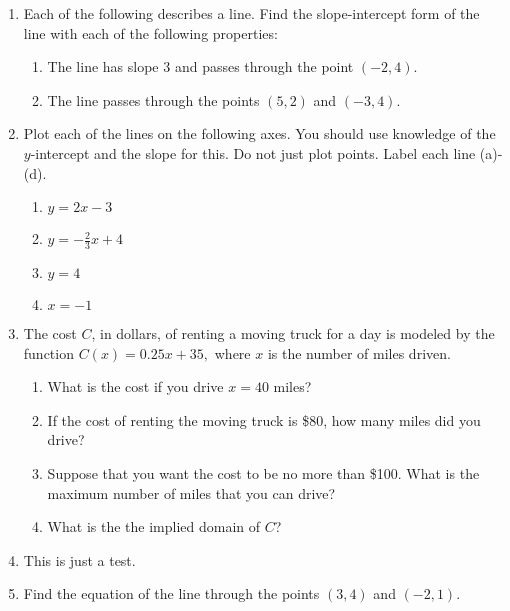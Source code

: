 \documentclass{article}
\providecommand{\tightlist}{%
  \setlength{\itemsep}{0pt}\setlength{\parskip}{0pt}}
\begin{document}
\begin{enumerate}
\item Each of the following describes a line. Find the slope-intercept form of
the line with each of the following properties:

\begin{enumerate}
\def\labelenumi{\arabic{enumi}.}
\item
  The line has slope 3 and passes through the point \((-2,4)\).
\item
  The line passes through the points \((5,2)\) and \((-3,4)\).
\end{enumerate}
\item Plot each of the lines on the following axes. You should use knowledge
of the \(y\)-intercept and the slope for this. Do not just plot points.
Label each line (a)-(d).

\begin{enumerate}
\def\labelenumi{\arabic{enumi}.}
\tightlist
\item
  \(y=2x-3\)
\item
  \(y=-\frac{2}{3}x + 4 \)
\item
  \(y=4\)
\item
  \(x=-1\)
\end{enumerate}
\item The cost \(C\), in dollars, of renting a moving truck for a day is
modeled by the function \(C(x)=0.25x+35,\) where \(x\) is the number of
miles driven.

\begin{enumerate}
\def\labelenumi{\arabic{enumi}.}
\tightlist
\item
  What is the cost if you drive \(x=40\) miles?
\item
  If the cost of renting the moving truck is \$80, how many miles did
  you drive?
\item
  Suppose that you want the cost to be no more than \$100. What is the
  maximum number of miles that you can drive?
\item
  What is the the implied domain of \(C\)?
\end{enumerate}
\item This is just a test.
\item Find the equation of the line through the points \((3,4)\) and
\((-2,1)\).

\end{enumerate}
\end{document}
